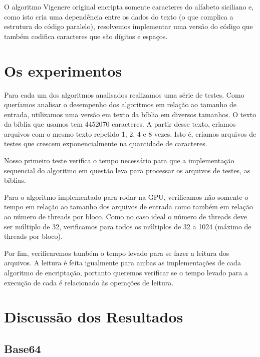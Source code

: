 \documentclass[12pt]{article}
\begin{document}
O algoritmo Vigenere original encripta somente caracteres do alfabeto
siciliano e, como isto cria uma dependência entre os dados do texto
(o que complica a estrutura do código paralelo), resolvemos implementar 
uma versão do código que também codifica caracteres que são dígitos 
e espaços.



\newpage
\section{Os experimentos}
Para cada um dos algoritmos analisados realizamos uma série de testes. 
Como queríamos analisar o desempenho dos algoritmos em relação ao 
tamanho de entrada, utilizamos uma versão em texto da bíblia em
diversos tamanhos. O texto da bíblia que usamos tem 4452070 caracteres.
A partir desse texto, criamos arquivos com o mesmo texto repetido 1, 2,
4 e 8 vezes. Isto é, criamos arquivos de testes que crescem 
exponencialmente na quantidade de caracteres.

Nosso primeiro teste verifica o tempo necessário para que a 
implementação sequencial do algoritmo em questão leva para processar os
arquivos de testes, as bíblias.

Para o algoritmo implementado para rodar na GPU, verificamos não
somente o tempo em relação ao tamanho dos arquivos de entrada como
também em relação ao número de threads por bloco. Como no caso ideal o
número de threads deve ser múltiplo de 32, verificamos para todos os
múltiplos de 32 a 1024 (máximo de threads por bloco).

Por fim, verificaremos também o tempo levado para se fazer a leitura dos
arquivos. A leitura é feita igualmente para ambas as implementações de
cada algoritmo de encriptação, portanto queremos verificar se o tempo
levado para a execução de cada é relacionado às operações de leitura.


\newpage
\section{Discussão dos Resultados}

\subsection{Base64}
\end{document}
